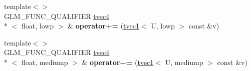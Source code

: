\begin{DoxyCompactItemize}
\item 
\hypertarget{structglm_1_1tvec4_a3caa4cc472906bedf67aeb0f6a102d43}{{\footnotesize template$<$$>$ }\\G\-L\-M\-\_\-\-F\-U\-N\-C\-\_\-\-Q\-U\-A\-L\-I\-F\-I\-E\-R \hyperlink{structglm_1_1tvec4}{tvec4}\\*
$<$ float, lowp $>$ \& {\bfseries operator+=} (\hyperlink{structglm_1_1tvec1}{tvec1}$<$ U, lowp $>$ const \&v)}\label{structglm_1_1tvec4_a3caa4cc472906bedf67aeb0f6a102d43}

\item 
\hypertarget{structglm_1_1tvec4_ab1a8d7ce5aca0b1dea28f73d63cbf69d}{{\footnotesize template$<$$>$ }\\G\-L\-M\-\_\-\-F\-U\-N\-C\-\_\-\-Q\-U\-A\-L\-I\-F\-I\-E\-R \hyperlink{structglm_1_1tvec4}{tvec4}\\*
$<$ float, mediump $>$ \& {\bfseries operator+=} (\hyperlink{structglm_1_1tvec1}{tvec1}$<$ U, mediump $>$ const \&v)}\label{structglm_1_1tvec4_ab1a8d7ce5aca0b1dea28f73d63cbf69d}

\end{DoxyCompactItemize}
